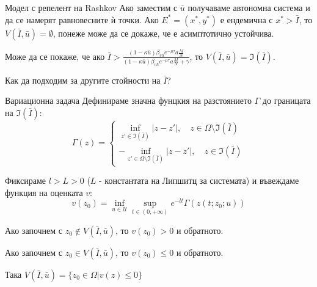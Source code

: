 \begin{frame}[t]{Модел с репелент на Rashkov}
  Ако заместим с $\bar{u}$ получаваме автономна система и да се намерят равновесните ѝ точки.
  Ако $E^* = (x^*, y^*)$ е ендемична с $x^* > \bar{I}$, то $V(\bar{I}, \bar{u}) = \emptyset$, понеже може да се докаже, че е асимптотично устойчива.

  Може да се покаже, че ако $\bar{I} > \frac{(1-\kappa \bar{u}) \beta_{vh} e^{-\mu \tau} a \frac{M}{N}}{(1-\kappa \bar{u}) \beta_{vh} e^{-\mu \tau} a \frac{M}{N} + \gamma}$, то $V(\bar{I}, \bar{u}) = \mathfrak{I}(\bar{I})$.

  Как да подходим за другите стойности на $\bar{I}$?
\end{frame}

\begin{frame}[t]{Вариационна задача}
  Дефинираме значна фунцкия на разстоянието $\Gamma$ до границата на $\mathfrak{I}(\bar{I})$:
  \begin{equation}
    \Gamma(z) =
    \begin{cases}
      \inf_{z' \in \mathfrak{I}(\bar{I})} |z-z'|, \quad z \in \Omega \setminus \mathfrak{I}(\bar{I}) \\
      -\inf_{z' \in \Omega \setminus \mathfrak{I}(\bar{I})} |z-z'|, \quad z \in \mathfrak{I}(\bar{I})
    \end{cases}
  \end{equation}

  Фиксираме $l>L>0$ ($L$ - константата на Липшитц за системата) и въвеждаме функция на оценката $v$:
  \begin{equation}
    v(z_0) = \inf_{u \in \mathscr{U}} \sup_{t \in (0, +\infty)} e^{-lt} \Gamma(z(t; z_0; u))
  \end{equation}

  Ако започнем с $z_0 \notin V(\bar{I}, \bar{u})$, то $v(z_0) > 0$ и обратното.

  Ако започнем с $z_0 \in V(\bar{I}, \bar{u})$, то $v(z_0) \leq 0$ и обратното.

  Така $V(\bar{I}, \bar{u}) = \{z_0 \in \Omega \vert v(z) \leq 0\}$
\end{frame}

